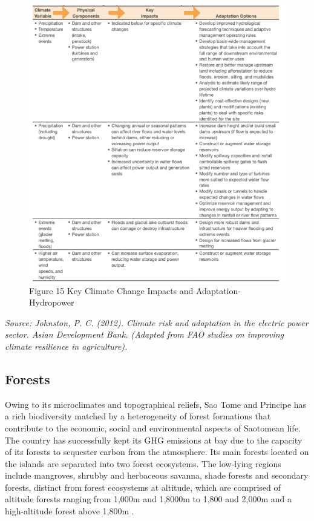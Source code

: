 \documentclass[
]{book}
\begin{document}
\begin{figure}
\centering
\includegraphics{images/ccimpacts_hydropower.png}
\caption{Figure 15 Key Climate Change Impacts and Adaptation- Hydropower}
\end{figure}

\emph{Source: Johnston, P. C. (2012). Climate risk and adaptation in the electric power sector. Asian Development Bank. (Adapted from FAO studies on improving climate resilience in agriculture).}

\hypertarget{forests}{%
\subsection{Forests}\label{forests}}

Owing to its microclimates and topographical reliefs, Sao Tome and Principe has a rich biodiversity matched by a heterogeneity of forest formations that contribute to the economic, social and environmental aspects of Saotomean life. The country has successfully kept its GHG emissions at bay due to the capacity of its forests to sequester carbon from the atmosphere. Its main forests located on the islands are separated into two forest ecosystems. The low-lying regions include mangroves, shrubby and herbaceous savanna, shade forests and secondary forests, distinct from forest ecosystems at altitude, which are comprised of altitude forests ranging from 1,000m and 1,8000m to 1,800 and 2,000m and a high-altitude forest above 1,800m .
\end{document}
